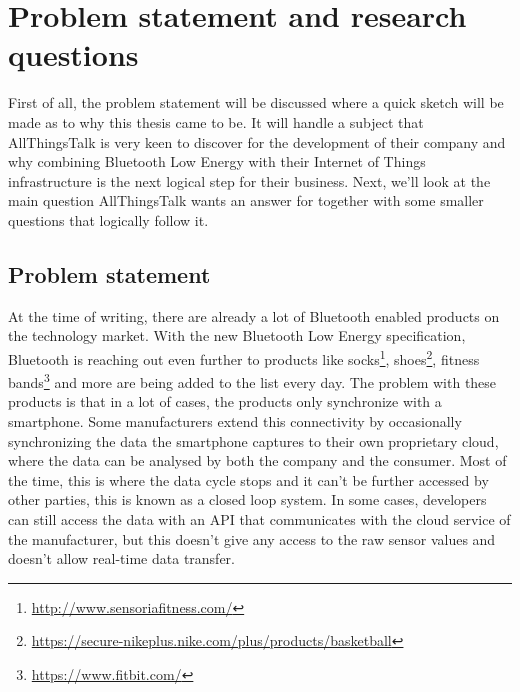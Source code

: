 \documentclass[pdftex,a4paper,12pt,twoside]{report}
\begin{document}


\newpage{}
\section{Problem statement and research questions}
\label{sec:problemdefinition}
First of all, the problem statement will be discussed where a quick sketch will be made as to why this thesis came to be. It will handle a subject that AllThingsTalk is very keen to discover for the development of their company and why combining Bluetooth Low Energy with their Internet of Things infrastructure is the next logical step for their business. Next, we'll look at the main question AllThingsTalk wants an answer for together with some smaller questions that logically follow it.

\subsection{Problem statement}
\label{subsec:problemstatement}
At the time of writing, there are already a lot of Bluetooth enabled products on the technology market. With the new Bluetooth Low Energy specification, Bluetooth is reaching out even further to products like socks\footnote{\url{http://www.sensoriafitness.com/}}, shoes\footnote{\url{https://secure-nikeplus.nike.com/plus/products/basketball}}, fitness bands\footnote{\url{https://www.fitbit.com/}} and more are being added to the list every day. The problem with these products is that in a lot of cases, the products only synchronize with a smartphone. Some manufacturers extend this connectivity by occasionally synchronizing the data the smartphone captures to their own proprietary cloud, where the data can be analysed by both the company and the consumer. Most of the time, this is where the data cycle stops and it can't be further accessed by other parties, this is known as a closed loop system. In some cases, developers can still access the data with an API that communicates with the cloud service of the manufacturer, but this doesn't give any access to the raw sensor values and doesn't allow real-time data transfer.
\end{document}
